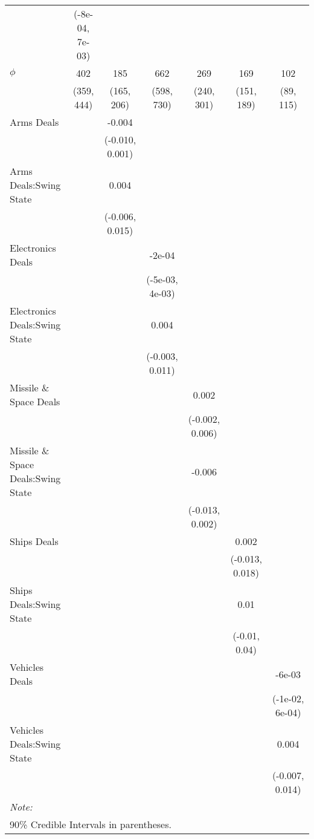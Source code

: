 \begin{table}
{\begin{tabular}[t]{lcccccc}
 & (-8e-04, 7e-03) &  &  &  &  & \\
$\phi$ & 402 & 185 & 662 & 269 & 169 & 102\\
 & (359, 444) & (165, 206) & (598, 730) & (240, 301) & (151, 189) & (89, 115)\\
Arms Deals &  & -0.004 &  &  &  & \\
 &  & (-0.010, 0.001) &  &  &  & \\
Arms Deals:Swing State &  & 0.004 &  &  &  & \\
 &  & (-0.006, 0.015) &  &  &  & \\
Electronics Deals &  &  & -2e-04 &  &  & \\
 &  &  & (-5e-03, 4e-03) &  &  & \\
Electronics Deals:Swing State &  &  & 0.004 &  &  & \\
 &  &  & (-0.003, 0.011) &  &  & \\
Missile \& Space Deals &  &  &  & 0.002 &  & \\
 &  &  &  & (-0.002, 0.006) &  & \\
Missile \& Space Deals:Swing State &  &  &  & -0.006 &  & \\
 &  &  &  & (-0.013, 0.002) &  & \\
Ships Deals &  &  &  &  & 0.002 & \\
 &  &  &  &  & (-0.013, 0.018) & \\
Ships Deals:Swing State &  &  &  &  & 0.01 & \\
 &  &  &  &  & (-0.01, 0.04) & \\
Vehicles Deals &  &  &  &  &  & -6e-03\\
 &  &  &  &  &  & (-1e-02, 6e-04)\\
Vehicles Deals:Swing State &  &  &  &  &  & 0.004\\
 &  &  &  &  &  & (-0.007, 0.014)\\
\bottomrule
\multicolumn{7}{l}{\rule{0pt}{1em}\textit{Note: }}\\
\multicolumn{7}{l}{\rule{0pt}{1em}90\% Credible Intervals in parentheses.}\\
\end{tabular}}
\end{table}

